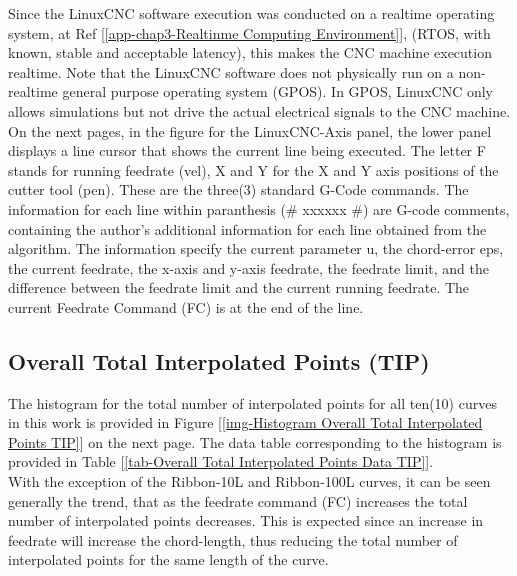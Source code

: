 Since the LinuxCNC software execution was conducted on a realtime operating system, at Ref [\ref{app-chap3-Realtinme Computing Environment}], (RTOS, with known, stable and acceptable latency), this makes the CNC machine execution realtime. Note that the LinuxCNC software does not physically run on a non-realtime general purpose operating system (GPOS). In GPOS, LinuxCNC only allows simulations but not drive the actual electrical signals to the CNC machine.\\

On the next pages, in the figure for the LinuxCNC-Axis panel, the lower panel displays a line cursor that shows the current line being executed. The letter F stands for running feedrate (vel), X and Y for the X and Y axis positions of the cutter tool (pen). These are the three(3) standard G-Code commands. The information for each line within paranthesis (\# xxxxxx \#) are G-code comments, containing the author's additional information for each line obtained from the algorithm. The information specify the current parameter u, the chord-error eps, the current feedrate, the x-axis and y-axis feedrate, the feedrate limit, and the difference between the feedrate limit and the current running feedrate. The current Feedrate Command (FC) is at the end of the line. 


\clearpage
\pagebreak

\subsection{Overall Total Interpolated Points (TIP)}

The histogram for the total number of interpolated points for all ten(10) curves in this work is provided in Figure [\ref{img-Histogram Overall Total Interpolated Points TIP}] on the next page. The data table corresponding to the histogram is provided in Table [\ref{tab-Overall Total Interpolated Points Data TIP}]. \\

With the exception of the Ribbon-10L and Ribbon-100L curves, it can be seen generally the trend, that as the feedrate command (FC) increases the total number of interpolated points decreases. This is expected since an increase in feedrate will increase the chord-length, thus reducing the total number of interpolated points for the same length of the curve.\\

